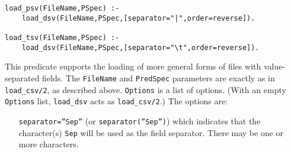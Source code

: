 \begin{description}
\begin{verbatim}
load_psv(FileName,PSpec) :-
    load_dsv(FileName,PSpec,[separator="|",order=reverse]).

load_tsv(FileName,PSpec) :-
    load_dsv(FileName,PSpec,[separator="\t",order=reverse]).
\end{verbatim}



This predicate supports the loading of more general forms of files
with value-separated fields.  The {\tt FileName} and {\tt PredSpec}
parameters are exactly as in {\tt load\_csv/2}, as described above.
{\tt Options} is a list of options.  (With an empty {\tt Options}
list, {\tt load\_dsv} acts as {\tt load\_csv/2}.)  The options are:
\begin{itemize}
\item[{\tt separator=''Sep''}] (or {\tt separator(''Sep'')}) which
  indicates that the character(s) {\tt Sep} will be used as the field
  separator.  There may be one or more characters.


\end{itemize}
\end{description}
